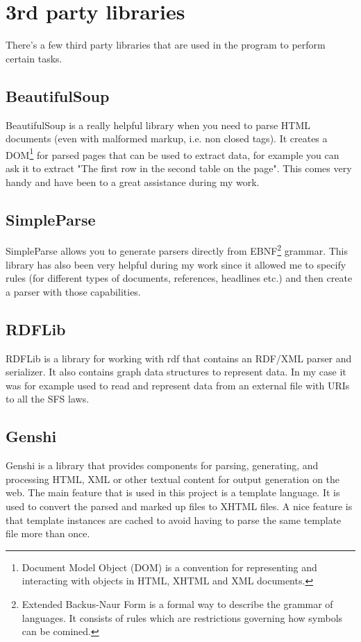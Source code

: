 \section{3rd party libraries}

There's a few third party libraries that are used in the program to perform certain tasks. 

\subsection{BeautifulSoup}

BeautifulSoup is a really helpful library when you need to parse HTML documents (even with malformed markup, i.e. non closed tags). It creates a DOM\footnote{Document Model Object (DOM) is a convention for representing and interacting with objects in HTML, XHTML and XML documents.} for parsed pages that can be used to extract data, for example you can ask it to extract "The first row in the second table on the page". This comes very handy and have been to a great assistance during my work.     

\subsection{SimpleParse}

SimpleParse allows you to generate parsers directly from EBNF\footnote{Extended Backus-Naur Form is a formal way to describe the grammar of languages. It consists of rules which are restrictions governing how symbols can be comined.} grammar. This library has also been very helpful during my work since it allowed me to specify rules (for different types of documents, references, headlines etc.) and then create a parser with those capabilities.  

\subsection{RDFLib}

RDFLib is a library for working with rdf that contains an RDF/XML parser and serializer. It also contains graph data structures to represent data. In my case it was for example used to read and represent data from  an external file with URIs to all the SFS laws.   

\subsection{Genshi}
Genshi is a library that provides components for parsing, generating, and processing HTML, XML or other textual content for output generation on the web. The main feature that is used in this project is a template language. It is used to convert the parsed and marked up files to XHTML files. A nice feature is that template instances are cached to avoid having to parse the same template file more than once.

